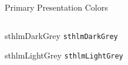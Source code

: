 \documentclass[compress,PxFont]{beamer}
\begin{document}
\begin{frame}{Primary Presentation Colors}
\begin{columns}
\begin{column}{.48\linewidth}
\begin{beamercolorbox}[wd=\linewidth,ht=2ex,dp=0.7ex]{sthlmDarkGrey}
	\texttt{sthlmDarkGrey}
\end{beamercolorbox}

\begin{beamercolorbox}[wd=\linewidth,ht=2ex,dp=0.7ex]{sthlmLightGrey}
	\texttt{sthlmLightGrey}
\end{beamercolorbox}
\end{column}
\end{columns}
\end{frame}

\end{document}
